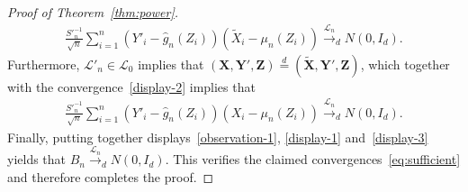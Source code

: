 \documentclass[ejs]{imsart}
\numberwithin{equation}{section}
\theoremstyle{plain}
\theoremstyle{definition}
\theoremstyle{remark}
\newcommand{\prx}{\bm X}
\newcommand{\srx}{X}
\newcommand{\prz}{\bm Z}
\newcommand{\srz}{Z}
\newcommand{\prxk}{{{\widetilde{\bm X}}}}
\newcommand{\srxk}{\widetilde X}
\newcommand{\pry}{{\bm Y}}
\begin{document}
\begin{proof}[Proof of Theorem~\ref{thm:power}]
\begin{equation}
		\begin{split}
			\frac{S'^{-1}_n}{\sqrt{n}}\sum_{i = 1}^n (Y'_i - \widehat g_n(Z_i))(\srxk_i - \mu_n(\srz_i)) \overset{\mathcal L_n}\rightarrow_d N(0, I_d).
			\label{display-2}
		\end{split}
	\end{equation}
	Furthermore, $\mathcal L'_n \in \mathscr L_0$ implies that $(\prx, \pry', \prz) \overset d = (\prxk, \pry', \prz)$, which together with the convergence~\eqref{display-2} implies that
	\begin{equation}
		\begin{split}
			\frac{S'^{-1}_n}{\sqrt{n}}\sum_{i = 1}^n (Y'_i - \widehat g_n(Z_i))(\srx_i - \mu_n(\srz_i)) \overset{\mathcal L_n}\rightarrow_d N(0, I_d).
			\label{display-3}
		\end{split}
	\end{equation}
	Finally, putting together displays~\eqref{observation-1}, \eqref{display-1} and~\eqref{display-3} yields that $B_n \overset{\mathcal L_n}\rightarrow_d N(0, I_d)$. This verifies the claimed convergences~\eqref{eq:sufficient} and therefore completes the proof.
\end{proof}
\end{document}
